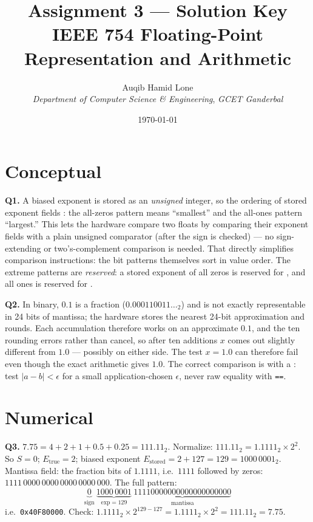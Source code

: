 \documentclass[11pt]{article}
\title{Assignment 3 --- Solution Key\\\large IEEE 754 Floating-Point Representation and Arithmetic}
\author{Auqib Hamid Lone\\[0.3em]
  \emph{Department of Computer Science \& Engineering}, \emph{GCET Ganderbal}}
\date{\today}
\begin{document}
\maketitle

\section{Conceptual}

\textbf{Q1.} A biased exponent is stored as an \emph{unsigned} integer, so the ordering of stored exponent fields : the all-zeros pattern means ``smallest'' and the all-ones pattern ``largest.'' This lets the hardware compare two floats by comparing their exponent fields with a plain unsigned comparator (after the sign is checked) --- no sign-extending or two's-complement comparison is needed. That directly simplifies comparison instructions: the bit patterns themselves sort in value order. The extreme patterns are \emph{reserved}: a stored exponent of all zeros is reserved for , and all ones is reserved for .

\textbf{Q2.} In binary, $0.1$ is a  fraction ($0.000110011\ldots_2$) and is not exactly representable in 24 bits of mantissa; the hardware stores the nearest 24-bit approximation and rounds. Each accumulation therefore works on an approximate $0.1$, and the ten rounding errors  rather than cancel, so after ten additions $x$ comes out slightly different from $1.0$ --- possibly on either side. The test $x = 1.0$ can therefore fail even though the exact arithmetic gives $1.0$. The correct comparison is with a : test $|a - b| < \epsilon$ for a small application-chosen $\epsilon$, never raw equality with \texttt{==}.

\section{Numerical}

\textbf{Q3.} $7.75 = 4 + 2 + 1 + 0.5 + 0.25 = 111.11_2$. Normalize: $111.11_2 = 1.1111_2 \times 2^{2}$. So $S = 0$; $E_{\text{true}} = 2$; biased exponent $E_{\text{stored}} = 2 + 127 = 129 = 1000\,0001_2$. Mantissa field: the fraction bits of $1.1111$, i.e.\ $1111$ followed by zeros: $1111\,0000\,0000\,0000\,0000\,000$. The full pattern:
\[
\underbrace{0}_{\text{sign}} \ \underbrace{1000\,0001}_{\text{exp}=129} \ \underbrace{11110000000000000000000}_{\text{mantissa}}
\]
i.e.\ \texttt{0x40F80000}. Check: $1.1111_2 \times 2^{129-127} = 1.1111_2 \times 2^2 = 111.11_2 = 7.75$.
\end{document}

